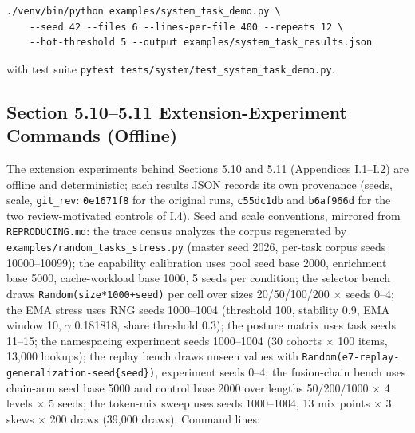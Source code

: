 \documentclass[
  11pt,
]{article}
\begin{document}
\begin{verbatim}
./venv/bin/python examples/system_task_demo.py \
    --seed 42 --files 6 --lines-per-file 400 --repeats 12 \
    --hot-threshold 5 --output examples/system_task_results.json
\end{verbatim}

with test suite
\texttt{pytest\ tests/system/test\_system\_task\_demo.py}.

\subsection{Section 5.10--5.11 Extension-Experiment Commands
(Offline)}\label{section-5.105.11-extension-experiment-commands-offline}

The extension experiments behind Sections 5.10 and 5.11 (Appendices
I.1--I.2) are offline and deterministic; each results JSON records its
own provenance (seeds, scale, \texttt{git\_rev}: \texttt{0e1671f8} for
the original runs, \texttt{c55dc1db} and \texttt{b6af966d} for the two
review-motivated controls of I.4). Seed and scale conventions, mirrored
from \texttt{REPRODUCING.md}: the trace census analyzes the corpus
regenerated by \texttt{examples/random\_tasks\_stress.py} (master seed
2026, per-task corpus seeds 10000--10099); the capability calibration
uses pool seed base 2000, enrichment base 5000, cache-workload base
1000, 5 seeds per condition; the selector bench draws
\texttt{Random(size*1000+seed)} per cell over sizes 20/50/100/200
\(\times\) seeds 0--4; the EMA stress uses RNG seeds 1000--1004
(threshold 100, stability 0.9, EMA window 10, \(\gamma\) 0.181818, share
threshold 0.3); the posture matrix uses task seeds 11--15; the
namespacing experiment seeds 1000--1004 (30 cohorts \(\times\) 100
items, 13,000 lookups); the replay bench draws unseen values with
\texttt{Random(\textquotesingle{}e7-replay-generalization-seed\{seed\}\textquotesingle{})},
experiment seeds 0--4; the fusion-chain bench uses chain-arm seed base
5000 and control base 2000 over lengths 50/200/1000 \(\times\) 4 levels
\(\times\) 5 seeds; the token-mix sweep uses seeds 1000--1004, 13 mix
points \(\times\) 3 skews \(\times\) 200 draws (39,000 draws). Command
lines:
\end{document}
